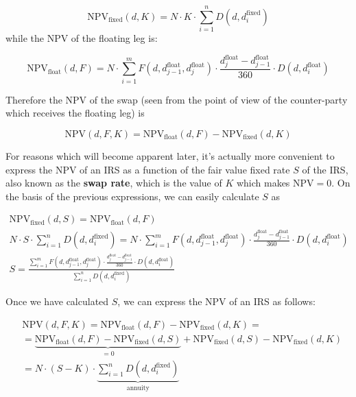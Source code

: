 \begin{equation}
\mathrm{NPV}_{\mathrm{fixed}}(d, K) = N\cdot K\cdot\sum_{i=1}^{n}D(d, d_{i}^{\mathrm{fixed}})
\end{equation}
while the NPV of the floating leg is:

\begin{equation}
\mathrm{NPV}_{\mathrm{float}}(d, F) = N\cdot\sum_{i=1}^{m}F(d, d_{j-1}^{\mathrm{float}}, d_{j}^{\mathrm{float}}) \cdot \frac{d_{j}^{\mathrm{float}}-d_{j-1}^{\mathrm{float}}}{360}
\cdot D(d, d_{i}^{\mathrm{float}})
\end{equation}

Therefore the NPV of the swap (seen from the point of view of the counter-party which receives the floating leg) is

\begin{equation}
\mathrm{NPV}(d, F, K) = \mathrm{NPV}_{\mathrm{float}}(d, F) - \mathrm{NPV}_{\mathrm{fixed}}(d, K)
\label{eq:irs_npv}
\end{equation}

For reasons which will become apparent later, it's actually more convenient to express the NPV of an IRS as a function of the fair value fixed rate $S$ of the IRS, also known as the \textbf{swap rate}, which is the value of $K$ which makes $\mathrm{NPV}=0$. On the basis of the previous expressions, we can easily calculate $S$ as

\begin{equation}
\begin{gathered}
\mathrm{NPV}_{\mathrm{fixed}}(d, S) = \mathrm{NPV}_{\mathrm{float}}(d, F)\\[5pt]
N\cdot S\cdot\sum_{i=1}^{n}D(d, d_{i}^{\mathrm{fixed}}) = N\cdot\sum_{i=1}^{m}F(d, d_{j-1}^{\mathrm{float}}, d_{j}^{\mathrm{float}}) \cdot \frac{d_{j}^{\mathrm{float}}-d_{j-1}^{\mathrm{float}}}{360} \cdot D(d, d_{i}^{\mathrm{float}})\\[5pt]
S=\frac{\sum_{i=1}^{m}F(d, d_{j-1}^{\mathrm{float}}, d_{j}^{\mathrm{float}}) \cdot \frac{d_{j}^{\mathrm{float}}-d_{j-1}^{\mathrm{float}}}{360}
\cdot D(d, d_{i}^{\mathrm{float}})}{\sum_{i=1}^{n}D(d, d_i^{\mathrm{fixed}})}
\end{gathered}
\end{equation}

Once we have calculated $S$, we can express the $\mathrm{NPV}$ of an IRS as follows:

\begin{equation}
\begin{split}&\mathrm{NPV}(d, F, K) = \mathrm{NPV}_{\mathrm{float}}(d, F) - \mathrm{NPV}_{\mathrm{fixed}}(d, K) = \\
&= \underbrace{\mathrm{NPV}_{\mathrm{float}}(d, F) - \mathrm{NPV}_{\mathrm{fixed}}(d, S)}_{\textstyle\mathrm{=0}} + \mathrm{NPV}_{\mathrm{fixed}}(d, S) - \mathrm{NPV}_{\mathrm{fixed}}(d, K) \\
& = N\cdot(S-K)\cdot\underbrace{\sum_{i=1}^{n}D(d, d_{i}^{\mathrm{fixed}})}_{\textstyle \mathrm{annuity}}
\end{split}
\label{eq:irs_npv2}
\end{equation}

